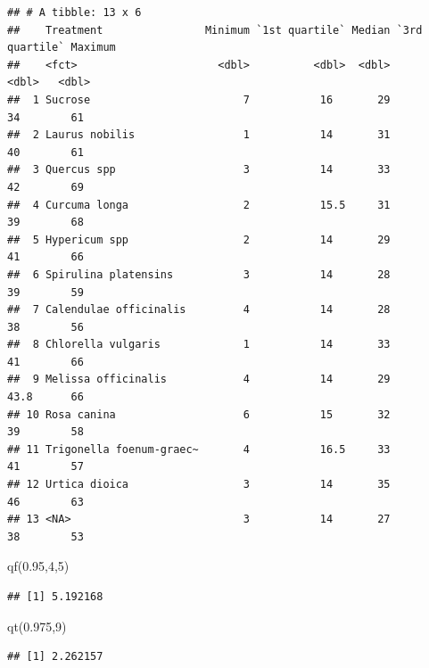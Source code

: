 \documentclass[
  brazilian,
  12pt,
  a4paper,
]{article}
\newenvironment{Shaded}{\begin{snugshade}}{\end{snugshade}}
\newcommand{\DecValTok}[1]{\textcolor[rgb]{0.68,0.00,0.00}{#1}}
\newcommand{\FloatTok}[1]{\textcolor[rgb]{0.68,0.00,0.00}{#1}}
\newcommand{\FunctionTok}[1]{\textcolor[rgb]{0.28,0.35,0.67}{#1}}
\newcommand{\NormalTok}[1]{\textcolor[rgb]{0.00,0.46,0.62}{#1}}
\begin{document}
\begin{verbatim}
## # A tibble: 13 x 6
##    Treatment                Minimum `1st quartile` Median `3rd quartile` Maximum
##    <fct>                      <dbl>          <dbl>  <dbl>          <dbl>   <dbl>
##  1 Sucrose                        7           16       29           34        61
##  2 Laurus nobilis                 1           14       31           40        61
##  3 Quercus spp                    3           14       33           42        69
##  4 Curcuma longa                  2           15.5     31           39        68
##  5 Hypericum spp                  2           14       29           41        66
##  6 Spirulina platensins           3           14       28           39        59
##  7 Calendulae officinalis         4           14       28           38        56
##  8 Chlorella vulgaris             1           14       33           41        66
##  9 Melissa officinalis            4           14       29           43.8      66
## 10 Rosa canina                    6           15       32           39        58
## 11 Trigonella foenum-graec~       4           16.5     33           41        57
## 12 Urtica dioica                  3           14       35           46        63
## 13 <NA>                           3           14       27           38        53
\end{verbatim}

\begin{Shaded}
\begin{Highlighting}[]
\FunctionTok{qf}\NormalTok{(}\FloatTok{0.95}\NormalTok{,}\DecValTok{4}\NormalTok{,}\DecValTok{5}\NormalTok{)}
\end{Highlighting}
\end{Shaded}

\begin{verbatim}
## [1] 5.192168
\end{verbatim}

\begin{Shaded}
\begin{Highlighting}[]
\FunctionTok{qt}\NormalTok{(}\FloatTok{0.975}\NormalTok{,}\DecValTok{9}\NormalTok{)}
\end{Highlighting}
\end{Shaded}

\begin{verbatim}
## [1] 2.262157
\end{verbatim}
\end{document}
